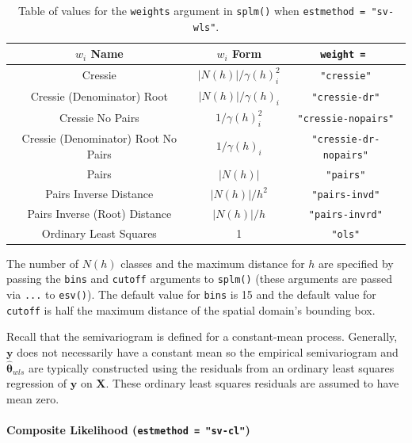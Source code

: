 \documentclass{article}
\begin{document}
\begin{table}
  \centering
  \begin{tabular}{c|c|c}
  \hline
  $w_i$ Name & $w_i$ Form & \texttt{weight = } \\
  \hline
  Cressie & $|N(h)| / \gamma(h)_i^2$ & \texttt{"cressie"} \\
  Cressie (Denominator) Root & $|N(h)| / \gamma(h)_i$ & \texttt{"cressie-dr"} \\
  Cressie No Pairs & $1 / \gamma(h)_i^2$ & \texttt{"cressie-nopairs"} \\
  Cressie (Denominator) Root No Pairs & $1 / \gamma(h)_i$ & \texttt{"cressie-dr-nopairs"} \\
  Pairs & $|N(h)|$ & \texttt{"pairs"} \\
  Pairs Inverse Distance & $|N(h)| / h^2$ & \texttt{"pairs-invd"} \\
  Pairs Inverse (Root) Distance & $|N(h)| / h$ & \texttt{"pairs-invrd"} \\
  Ordinary Least Squares & 1 & \texttt{"ols"} \\
  \hline
  \end{tabular}
  \caption{Table of values for the \texttt{weights} argument in \texttt{splm()} when \texttt{estmethod = "sv-wls"}.}
  \label{tab:weights}
\end{table}

The number of \(N(h)\) classes and the maximum distance for \(h\) are
specified by passing the \texttt{bins} and \texttt{cutoff} arguments to
\texttt{splm()} (these arguments are passed via \texttt{...} to
\texttt{esv()}). The default value for \texttt{bins} is 15 and the
default value for \texttt{cutoff} is half the maximum distance of the
spatial domain's bounding box.

Recall that the semivariogram is defined for a constant-mean process.
Generally, \(\mathbf{y}\) does not necessarily have a constant mean so
the empirical semivariogram and \(\boldsymbol{\hat{\theta}}_{wls}\) are
typically constructed using the residuals from an ordinary least squares
regression of \(\mathbf{y}\) on \(\mathbf{X}\). These ordinary least
squares residuals are assumed to have mean zero.

\hypertarget{composite-likelihood-estmethod-sv-cl}{%
\paragraph{\texorpdfstring{Composite Likelihood
(\texttt{estmethod\ =\ "sv-cl"})}{Composite Likelihood (estmethod = "sv-cl")}}\label{composite-likelihood-estmethod-sv-cl}}
\end{document}

